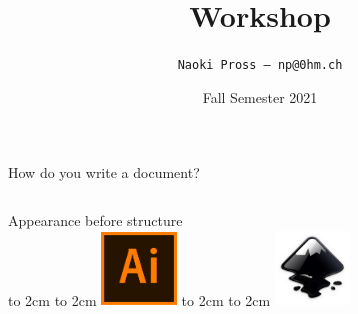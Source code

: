 \documentclass[xetex, onlymath, handout]{beamer}
\title{\textrm{\LaTeXe} Workshop}
\author[NaoPross]{\texttt{Naoki Pross -- np@0hm.ch}}
\date{Fall Semester 2021}
\institute[OST]{OST FHO Campus Rapperswil}
\begin{document}
\begin{frame}
\maketitle
\end{frame}

\begin{frame}{How do you write a document?}
\begin{columns}
  \begin{column}{.3\linewidth}
    \begin{center}
      {\large Appearance before structure} \\
      \vspace{1cm}
      \vbox to 2cm {\vfil\hfil \hbox to 2cm {
          \includegraphics[width=2cm]{figs/illustrator-logo}
      } \hfil\vfil }
      \vspace{1cm}
      \vbox to 2cm {\vfil\hfil \hbox to 2cm {
        \includegraphics[width=2cm]{figs/inkscape-logo}
      } \hfil\vfil }
    \end{center}
  \end{column}
  \begin{column}{.3\linewidth}
\end{column}
\end{columns}
\end{frame}
\end{document}
